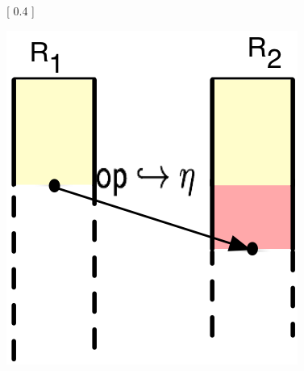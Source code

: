 \begin{figure}
\centering
{} [
  0.4\columnwidth
] {
  \includegraphics[scale=0.5]{Figures/ec-theirs}
 
}
\end{figure}
